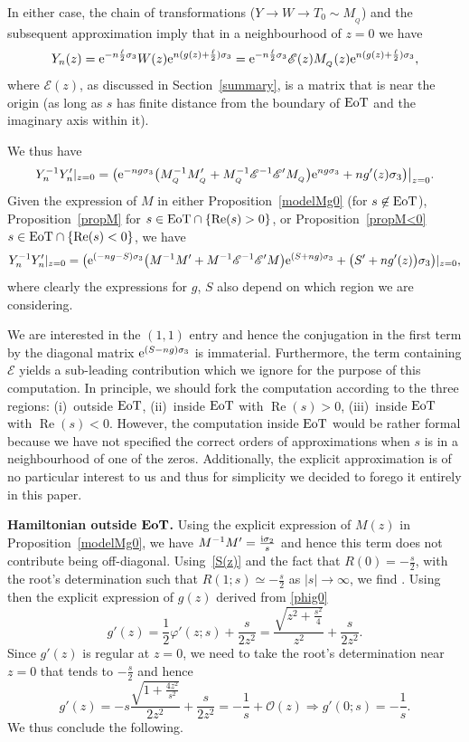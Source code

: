 \documentclass[pdftex]{sigma}
\numberwithin{equation}{section}
\theoremstyle{definition}
\def \scr{\mathscr}
\def \1{\mathbf 1}
\def\s{\sigma}
\def \Re{\operatorname{Re} }
\begin{document}
 In either case, the chain of transformations ($Y\to W\to T_0 \sim M_{_Q}$) and the subsequent approximation imply that in a neighbourhood of $z=0$ we have
 \[
 Y_n(z) = {\rm e}^{-n\frac \ell 2\s_3} W(z){\rm e}^{n(g(z) + \frac \ell 2)\s_3}=
 {\rm e}^{-n\frac \ell 2\s_3} \scr E (z) M_{_Q} (z){\rm e}^{n(g(z) + \frac \ell 2)\s_3},
 \]
 where $\scr E(z)$, as discussed in Section~\ref{summary}, is a matrix that is \smash{$\1+ \mathcal O\bigl(\frac 1{n \vartheta(G- \frac {\tau+1}2)^2} \bigr)$} near the origin (as long as $s$ has finite distance from the boundary of ${\rm EoT}$ and the imaginary axis within it).

We thus have
\[
Y_n^{-1} Y_n' |_{z=0} =\bigl({\rm e}^{-ng\s_3} \bigl(M_{_Q}^{-1} M_{_Q}' + M^{-1}_{_Q} \scr E^{-1} \scr E' M_{_Q} \bigr) {\rm e}^{ng\s_3}+ n g'(z) \s_3 \bigr)\big|_{z=0}.
\]
Given the expression of $M$ in either Proposition~\ref{modelMg0} (for $s\not\in {\rm EoT}$), Proposition~\ref{propM} for $s\in {\rm EoT}\cap\{\Re (s)> 0\}$, or Proposition~\ref{propM<0} $s\in {\rm EoT}\cap\{\Re (s)< 0\}$, we have
 \[
Y_n^{-1} Y_n' |_{z=0} =\bigl( {\rm e}^{(-ng-S)\s_3} \bigl(M^{-1} M' + M^{-1} \scr E^{-1} \scr E' M\bigr){\rm e}^{(S+ ng)\s_3} +\bigl(S'+ n g'(z)\bigr) \s_3 \bigr)|_{z=0},
\]
where clearly the expressions for $g$, $S$ also depend on which region we are considering.

We are interested in the $(1,1)$ entry and hence the conjugation in the first term by the diagonal matrix ${\rm e}^{(S-ng)\s_3}$ is immaterial. Furthermore, the term containing $\scr E$ yields a sub-leading contribution which we ignore for the purpose of this computation.
In principle, we should fork the computation according to the three regions: (i)~outside ${\rm EoT}$, (ii)~inside ${\rm EoT}$ with $\Re (s)>0$, (iii)~inside ${\rm EoT}$ with $\Re(s)<0$. However, the computation inside ${\rm EoT}$ would be rather formal because we have not specified the correct orders of approximations when $s$ is in a neighbourhood of one of the zeros.
Additionally, the explicit approximation is of no particular interest to us and thus for simplicity we decided to forego it entirely in this paper.

{\bf Hamiltonian outside $\boldsymbol{{\rm EoT}}$.}
 Using the explicit expression of $M(z)$ in Proposition~\ref{modelMg0}, we have
 $ M^{-1}M' = \frac {{\rm i}\s_2}s $
 and hence this term does not contribute being off-diagonal.
 Using~\eqref{S(z)} and the fact that $R(0)=-\frac s 2$,  with the root's determination such that $R(1;s)\simeq -\frac s 2$ as $|s|\to\infty$, we find
.
 Using then the explicit expression of $g(z)$ derived from \eqref{phig0}
 \[
 g'(z) = \frac 1 2 \varphi'(z;s) + \frac{s}{2z^2} = \frac{\sqrt{z^2+\frac {s^2}4}}{z^2} + \frac s {2z^2}.
 \]
 Since $g'(z)$ is regular at $z=0$, we need to take the root's determination near $z=0$ that tends to $-\frac s 2$ and hence
 \[
 g'(z) =-s \frac{\sqrt{1+\frac {4z^2}{s^2} }}{2z^2} + \frac s {2z^2} = -\frac 1 s + \mathcal O(z) \Rightarrow g'(0;s) = -\frac 1 s.
 \]
 We thus conclude the following.
\end{document}
